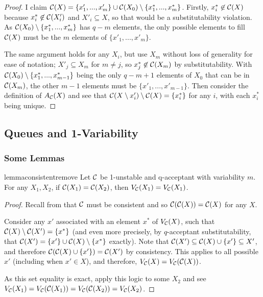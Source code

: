 \begin{proof}
I claim $\mathcal{C}(X) = \{x'_1,...,x'_m\} \cup \mathcal{C}(X_0) \setminus \{x^*_1,..., x^*_m\}$. Firstly, $x^*_i \not\in \mathcal{C}(X)$ because  $x^*_i \not\in \mathcal{C}(X'_i)$ and $X'_i \subseteq X$, so that would be a substitutability violation. As $\mathcal{C}(X_0) \setminus \{x^*_1,..., x^*_m\}$ has $q-m$ elements, the only possible elements to fill $\mathcal{C}(X)$ must be the $m$ elements of $\{x'_1,...,x'_m\}$.

The same argument holds for any $X_i$, but use $X_m$ without loss of generality for ease of notation; $X'_j \subseteq X_m$ for $m \neq j$, so $x^*_j \not\in\mathcal{C}(X_m)$ by substitutability. With $\mathcal{C}(X_0) \setminus \{x^*_1,..., x^*_{m-1}\}$ being the only $q-m+1$ elements of $X_0$ that can be in $\mathcal{C}(X_m)$, the other $m-1$ elements must be $\{x'_1,. .., x'_{m-1}\}$. Then consider the definition of $A_{\mathcal{C}}(X)$ and see that $\mathcal{C}(X \setminus x'_i) \setminus \mathcal{C}(X) = \{x^*_i\}$ for any $i$, with each $x^*_i$ being unique.
\end{proof}

\subsection{Queues and 1-Variability}\label{sec:ranking-proof}

\subsubsection{Some Lemmas}

\begin{restatable}{lemma}{consistentremove}
\label{lem:consistent-remove}
Let $\mathcal{C}$ be 1-unstable and q-acceptant with variability $m$. For any $X_1, X_2$, if $\mathcal{C}(X_1) = \mathcal{C}(X_2)$, then $V_{\mathcal{C}}(X_1) = V_{\mathcal{C}}(X_1)$.
\end{restatable}

\begin{proof}
Recall from  that $\mathcal{C}$ must be consistent and so $\mathcal{C}(\mathcal{C}(X)) = \mathcal{C}(X)$ for any $X$.

Consider any $x'$ associated with an element $x^*$ of $V_{\mathcal{C}}(X)$, such that $\mathcal{C}(X) \setminus \mathcal{C}(X') = \{x^*\}$ (and even more precisely, by $q$-acceptant substitutability, that $\mathcal{C}(X') = \{x'\} \cup \mathcal{C}(X) \setminus \{x^*\}$ exactly). Note that $\mathcal{C}(X') \subseteq \mathcal{C}(X) \cup \{x'\} \subseteq X'$, and therefore $\mathcal{C}(\mathcal{C}(X) \cup \{x'\}) = \mathcal{C}(X')$ by consistency. This applies to all possible $x'$ (including when $x' \in X$), and therefore, $V_{\mathcal{C}}(X) = V_{\mathcal{C}}(\mathcal{C}(X))$.

As this set equality is exact, apply this logic to some $X_2$ and see $V_{\mathcal{C}}(X_1) = V_{\mathcal{C}}(\mathcal{C}(X_1)) = V_{\mathcal{C}}(\mathcal{C}(X_2)) = V_{\mathcal{C}}(X_2)$.
\end{proof}

